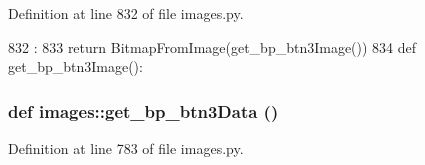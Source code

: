 Definition at line 832 of file images.py.


\begin{DoxyCode}
832                        :
833     return BitmapFromImage(get_bp_btn3Image())
834 
def get_bp_btn3Image():
\end{DoxyCode}
\hypertarget{namespaceimages_ac519a27c44d55628abd4b8c9024a4063}{
\subsubsection[{get\_\-bp\_\-btn3Data}]{\setlength{\rightskip}{0pt plus 5cm}def images::get\_\-bp\_\-btn3Data ()}}
\label{namespaceimages_ac519a27c44d55628abd4b8c9024a4063}


Definition at line 783 of file images.py.


